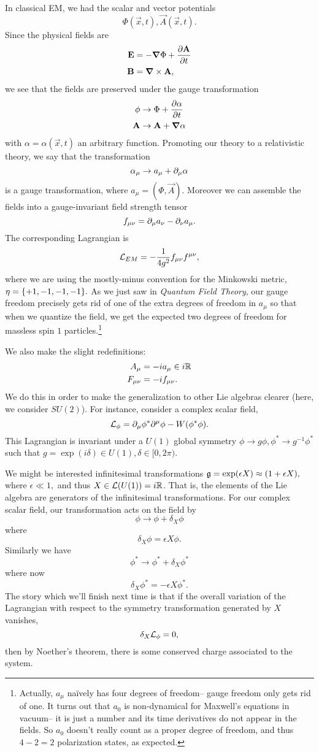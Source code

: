 In classical EM, we had the scalar and vector potentials
$$\Phi(\vec x,t),\vec A(\vec x,t).$$
Since the physical fields are 
\begin{align*}
    \boldsymbol{\mathbf{E}}&=-\mbox{\boldmath$ \nabla $} \Phi+\frac{\partial \boldsymbol{\mathbf{A}}}{\partial t}\\
    \boldsymbol{\mathbf{B}}&= \mbox{\boldmath$ \nabla $} \times \boldsymbol{\mathbf{A}},
\end{align*} we see that the fields are preserved under the gauge transformation
\begin{align*}
    \phi&\to \Phi+\frac{\partial \alpha}{\partial t}\\
    \boldsymbol{\mathbf{A}}&\to \boldsymbol{\mathbf{A}} +\mbox{\boldmath$ \nabla $} \alpha
\end{align*}
with $\alpha=\alpha(\vec x,t)$ an arbitrary function. Promoting our theory to a relativistic theory, we say that the transformation
$$\alpha_\mu \to a_\mu + \partial_\mu \alpha$$
is a gauge transformation, where $a_\mu=(\Phi,\vec A).$ Moreover we can assemble the fields into a gauge-invariant field strength tensor
$$f_{\mu\nu}=\partial_\mu a_\nu -\partial_\nu a_\mu.$$
The corresponding Lagrangian is
$$\mathcal L_{EM}=-\frac{1}{4g^2}f_{\mu\nu}f^{\mu\nu},$$
where we are using the mostly-minus convention for the Minkowski metric, $\eta=\{+1,-1,-1,-1\}.$
As we just saw in \emph{Quantum Field Theory}, our gauge freedom precisely gets rid of one of the extra degrees of freedom in $a_\mu$ so that when we quantize the field, we get the expected two degrees of freedom for massless spin $1$ particles.\footnote{Actually, $a_\mu$ na\"ively has four degrees of freedom-- gauge freedom only gets rid of one. It turns out that $a_0$ is non-dynamical for Maxwell's equations in vacuum-- it is just a number and its time derivatives do not appear in the fields. So $a_0$ doesn't really count as a proper degree of freedom, and thus $4-2=2$ polarization states, as expected.}

We also make the slight redefinitions:
\begin{align*}
    A_\mu &= -i a_\mu \in i\mathbb{R}\\
    F_{\mu\nu}&= -i f_{\mu\nu}.
\end{align*}
We do this in order to make the generalization to other Lie algebras clearer (here, we consider $SU(2)$). For instance, consider a complex scalar field,
$$\mathcal L_\phi = \partial_\mu \phi^* \partial^\mu \phi - W(\phi^* \phi).$$
This Lagrangian is invariant under a $U(1)$ global symmetry $\phi \to g \phi, \phi^* \to g^{-1} \phi^*$ such that $g = \exp(i\delta) \in U(1), \delta \in [0,2\pi)$.

We might be interested infinitesimal transformations
$\mathfrak{g} = \exp(\epsilon X)\approx (1+\epsilon X),$
where $\epsilon \ll 1,$ and thus $X\in \mathcal L(U(1))= i\mathbb{R}$. That is, the elements of the Lie algebra are generators of the infinitesimal transformations. For our complex scalar field, our transformation acts on the field by
$$\phi \to \phi+\delta_X \phi$$
where
$$\delta_X \phi = \epsilon X \phi.$$
Similarly we have
$$\phi^*\to \phi^*+\delta_X \phi^*$$
where now
$$\delta_X \phi^* = -\epsilon X \phi^*.$$
The story which we'll finish next time is that if the overall variation of the Lagrangian with respect to the symmetry transformation generated by $X$ vanishes,
$$\delta_X \mathcal L_\phi =0,$$
then by Noether's theorem, there is some conserved charge associated to the system.